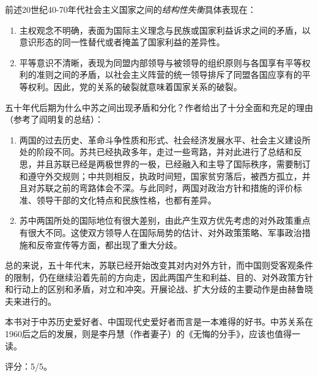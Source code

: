 前述20世纪40-70年代社会主义国家之间的\emph{结构性失衡}具体表现在：
\begin{enumerate}
    \item 主权观念不明确，表面为国际主义理念与民族或国家利益诉求之间的矛盾，以意识形态的同一性替代或者掩盖了国家利益的差异性。
    \item 平等意识不清晰，表现为同盟内部领导与被领导的组织原则与各国享有平等权利的准则之间的矛盾，以社会主义阵营的统一领导排斥了同盟各国应享有的平等权利。因此，党的关系的破裂就意味着国家关系的破裂。
\end{enumerate}

五十年代后期为什么中苏之间出现矛盾和分化？作者给出了十分全面和充足的理由（参考了阎明复的总结）：
\begin{enumerate}
    \item 两国的过去历史、革命斗争性质和形式、社会经济发展水平、社会主义建设所处的阶段不同。苏共已经执政多年，走过一些弯路，并对此进行了总结和反思，并且苏联已经是两极世界的一极，已经融入和主导了国际秩序，需要制订和遵守外交规则；中共则相反，执政时间短，国家贫穷落后，被西方孤立，并且对苏联之前的弯路体会不深。与此同时，两国对政治方针和措施的评价标准、领导干部的文化特点和民族性格，也都有差异。
    \item 苏中两国所处的国际地位有很大差别，由此产生双方优先考虑的对外政策重点有很大不同。这使双方领导人在国际局势的估计、对外政策策略、军事政治措施和反帝宣传等方面，都出现了重大分歧。
\end{enumerate}

总的来说，五十年代末，苏联已经开始改变其对内对外方针，而中国则受客观条件的限制，仍在继续沿着先前的方向走，因此两国产生和利益、目的、对外政策方针和行动上的区别和矛盾，对立和冲突。开展论战、扩大分歧的主要动作是由赫鲁晓夫来进行的。

本书对于中苏历史爱好者、中国现代史爱好者而言是一本难得的好书。中苏关系在1960后之后的发展，则是李丹慧（作者妻子）的《无悔的分手》，应该也值得一读。

评分：5/5。